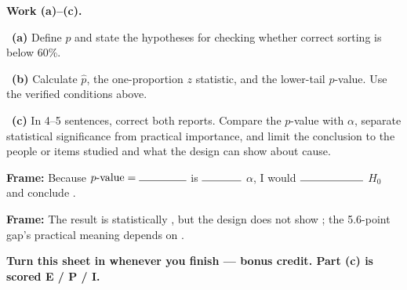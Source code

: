 \documentclass[11pt]{article}
\begin{document}
\newpage
\textbf{Work (a)--(c).}\par\smallskip

~\textbf{(a)} Define $p$ and state the hypotheses for checking whether correct sorting is below 60\%.\par
\workspace{0.8in}

~\textbf{(b)} Calculate $\widehat p$, the one-proportion $z$ statistic, and the lower-tail $p$-value. Use the verified conditions above.\par
\workspace{1.4in}

~\textbf{(c)} In 4--5 sentences, correct both reports. Compare the $p$-value with $\alpha$, separate statistical significance from practical importance, and limit the conclusion to the people or items studied and what the design can show about cause.\par
\workspace{2.0in}

\begin{sentenceframebox}\raggedright\textbf{Frame:} Because $p\text{-value}=\blank[0.6in]$ is $\blank[0.5in]$ $\alpha$, I would $\blank[0.8in]$ $H_0$ and conclude \blank[2.2in].\end{sentenceframebox}

\begin{sentenceframebox}\raggedright\textbf{Frame:} The result is statistically \blank[0.8in], but the design does not show \blank[2.2in]; the 5.6-point gap's practical meaning depends on \blank[1.5in].\end{sentenceframebox}

\textbf{Turn this sheet in whenever you finish --- bonus credit. Part (c) is scored E / P / I.}\par
\end{document}
